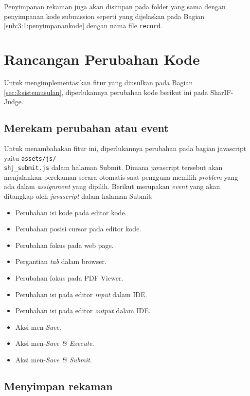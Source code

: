 Penyimpanan rekaman juga akan disimpan pada folder yang sama dengan penyimpanan kode submission seperti yang dijelaskan pada Bagian \ref{sub:3:1:penyimpanankode} dengan nama file \verb|record|.

\section{Rancangan Perubahan Kode}

Untuk mengimplementasikan fitur yang diusulkan pada Bagian \ref{sec:3:sistemusulan}, diperlukannya perubahan kode berikut ini pada SharIF-Judge.


\subsection{Merekam perubahan atau event}
\label{sub:4:3:merekam}

Untuk menambahakan fitur ini, diperlukannya perubahan pada bagian javascript yaitu \verb|assets/js/|\\\verb|shj_submit.js| dalam halaman Submit. Dimana javascript tersebut akan menjalankan perekaman secara otomatis saat pengguna memilih \textit{problem} yang ada dalam \textit{assignment} yang dipilih. Berikut merupakan \textit{event} yang akan ditangkap oleh \textit{javascript} dalam halaman Submit:

\begin{itemize}
    \item Perubahan isi kode pada editor kode.
    \item Perubahan posisi cursor pada editor kode.
    \item Perubahan fokus pada web page.
    \item Pergantian \textit{tab} dalam browser.
    \item Perubahan fokus pada PDF Viewer.
    \item Perubahan isi pada editor \textit{input} dalam IDE.
    \item Perubahan isi pada editor \textit{output} dalam IDE.
    \item Aksi men-\textit{Save}.
    \item Aksi men-\textit{Save \& Execute}.
    \item Aksi men-\textit{Save \& Submit}.
\end{itemize}

\subsection{Menyimpan rekaman}
\label{sub:4:3:menyimpanrekaman}


